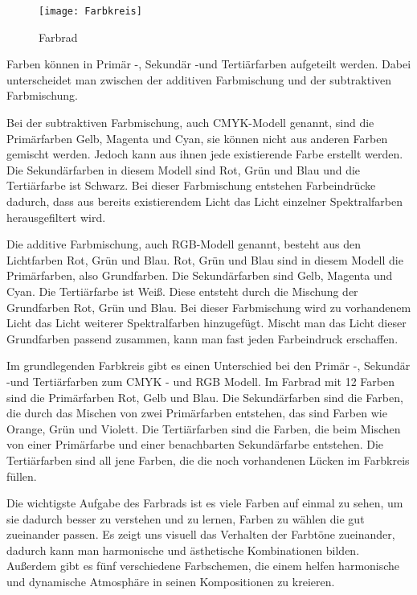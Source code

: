 \begin{figure}[H]
	\centering
	\texttt{[image: Farbkreis]}
	\caption{Farbrad\cite{_special_subjects}}
\end{figure}

Farben können in Primär -, Sekundär -und Tertiärfarben aufgeteilt werden. Dabei unterscheidet man zwischen der additiven Farbmischung und der subtraktiven Farbmischung. 
\cite{_special_subjects}
\cite{_line_color_form}

Bei der subtraktiven Farbmischung, auch CMYK-Modell genannt, sind die Primärfarben Gelb, Magenta und Cyan, sie können nicht aus anderen Farben gemischt werden. Jedoch kann aus ihnen jede existierende Farbe erstellt werden. Die Sekundärfarben in diesem Modell sind Rot, Grün und Blau und die Tertiärfarbe ist Schwarz. Bei dieser Farbmischung entstehen Farbeindrücke dadurch, dass aus bereits existierendem Licht das Licht einzelner Spektralfarben herausgefiltert wird.
\cite{_special_subjects}
\cite{_salierdruck}
\cite{_leifi_physik_subtraktive_farbmischung}

Die additive Farbmischung, auch RGB-Modell genannt, besteht aus den Lichtfarben Rot, Grün und Blau. Rot, Grün und Blau sind in diesem Modell die Primärfarben, also Grundfarben. Die Sekundärfarben sind Gelb, Magenta und Cyan. Die Tertiärfarbe ist Weiß. Diese entsteht durch die Mischung der Grundfarben Rot, Grün und Blau. Bei dieser Farbmischung wird zu vorhandenem Licht das Licht weiterer Spektralfarben hinzugefügt. Mischt man das Licht dieser Grundfarben passend zusammen, kann man fast jeden Farbeindruck erschaffen.
\cite{_special_subjects}
\cite{_salierdruck}
\cite{_leifi_physik_additive_farbmischung}

Im grundlegenden Farbkreis gibt es einen Unterschied bei den Primär -, Sekundär -und Tertiärfarben zum CMYK - und RGB Modell. Im Farbrad mit 12 Farben sind die Primärfarben Rot, Gelb und Blau. Die Sekundärfarben sind die Farben, die durch das Mischen von zwei Primärfarben entstehen, das sind Farben wie Orange, Grün und Violett. Die Tertiärfarben sind die Farben, die beim Mischen von einer Primärfarbe und einer benachbarten Sekundärfarbe entstehen. Die Tertiärfarben sind all jene Farben, die die noch vorhandenen Lücken im Farbkreis füllen.
\cite{_special_subjects}
\cite{_salierdruck}
\cite{_line_color_form}

Die wichtigste Aufgabe des Farbrads ist es viele Farben auf einmal zu sehen, um sie dadurch besser zu verstehen und zu lernen, Farben zu wählen die gut zueinander passen. Es zeigt uns visuell das Verhalten der Farbtöne zueinander, dadurch kann man harmonische und ästhetische Kombinationen bilden.
Außerdem gibt es fünf verschiedene Farbschemen, die einem helfen harmonische und dynamische Atmosphäre in seinen Kompositionen zu kreieren.
\cite{_special_subjects}
\cite{_drawing_basics_and_video_game_art}

